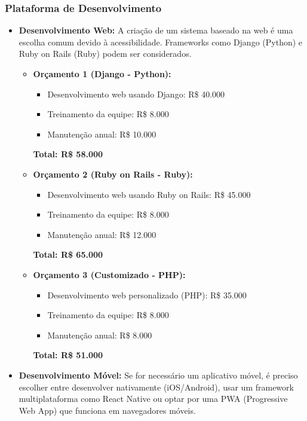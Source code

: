 	\subsubsection{Plataforma de Desenvolvimento}
	\begin{itemize}
		\item \textbf{Desenvolvimento Web:} A criação de um sistema baseado na web é uma escolha comum devido à acessibilidade. Frameworks como Django (Python) e Ruby on Rails (Ruby) podem ser considerados.
		
		\begin{itemize}
			\item \textbf{Orçamento 1 (Django - Python):}
			\begin{itemize}
				\item Desenvolvimento web usando Django: R\$ 40.000
				\item Treinamento da equipe: R\$ 8.000
				\item Manutenção anual: R\$ 10.000
			\end{itemize}
			
			\textbf{Total: R\$ 58.000}
			
			\item \textbf{Orçamento 2 (Ruby on Rails - Ruby):}
			\begin{itemize}
				\item Desenvolvimento web usando Ruby on Rails: R\$ 45.000
				\item Treinamento da equipe: R\$ 8.000
				\item Manutenção anual: R\$ 12.000
			\end{itemize}
			
			\textbf{Total: R\$ 65.000}
			
			\item \textbf{Orçamento 3 (Customizado - PHP):}
			\begin{itemize}
				\item Desenvolvimento web personalizado (PHP): R\$ 35.000
				\item Treinamento da equipe: R\$ 8.000
				\item Manutenção anual: R\$ 8.000
			\end{itemize}
			
			\textbf{Total: R\$ 51.000}
		\end{itemize}
		
		
		\item \textbf{Desenvolvimento Móvel:} Se for necessário um aplicativo móvel, é preciso escolher entre desenvolver nativamente (iOS/Android), usar um framework multiplataforma como React Native ou optar por uma PWA (Progressive Web App) que funciona em navegadores móveis.
		

\end{itemize}
